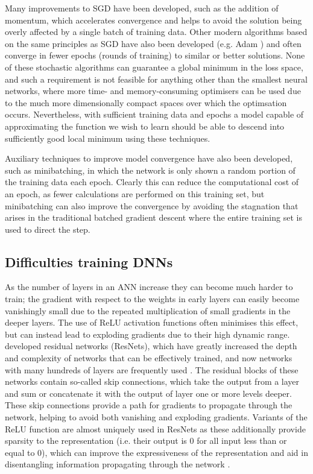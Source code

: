 Many improvements to SGD have been developed, such as the addition of momentum, which accelerates convergence and helps to avoid the solution being overly affected by a single batch of training data.
Other modern algorithms based on the same principles as SGD have also been developed (e.g. Adam \citet{2014Kingma}) and often converge in fewer epochs (rounds of training) to similar or better solutions.
None of these stochastic algorithms can guarantee a global minimum in the loss space, and such a requirement is not feasible for anything other than the smallest neural networks, where more time- and memory-consuming optimisers can be used due to the much more dimensionally compact spaces over which the optimsation occurs.
Nevertheless, with sufficient training data and epochs a model capable of approximating the function we wish to learn should be able to descend into sufficiently good local minimum using these techniques.

Auxiliary techniques to improve model convergence have also been developed, such as minibatching, in which the network is only shown a random portion of the training data each epoch.
Clearly this can reduce the computational cost of an epoch, as fewer calculations are performed on this training set, but minibatching can also improve the convergence by avoiding the stagnation that arises in the traditional batched gradient descent where the entire training set is used to direct the step.


\subsection{Difficulties training DNNs}

As the number of layers in an ANN increase they can become much harder to train; the gradient with respect to the weights in early layers can easily become vanishingly small due to the repeated multiplication of small gradients in the deeper layers.
The use of ReLU activation functions often minimises this effect, but can instead lead to exploding gradients due to their high dynamic range.
\citet{2015He} developed residual networks (ResNets), which have greatly increased the depth and complexity of networks that can be effectively trained, and now networks with many hundreds of layers are frequently used \citep{Jegou2017}.
The residual blocks of these networks contain so-called skip connections, which take the output from a layer and sum or concatenate it with the output of layer one or more levels deeper.
These skip connections provide a path for gradients to propagate through the network, helping to avoid both vanishing and exploding gradients.
Variants of the ReLU function are almost uniquely used in ResNets as these additionally provide sparsity to the representation (i.e. their output is 0 for all input less than or equal to 0), which can improve the expressiveness of the representation and aid in disentangling information propagating through the network \citep{Glorot2011}.

